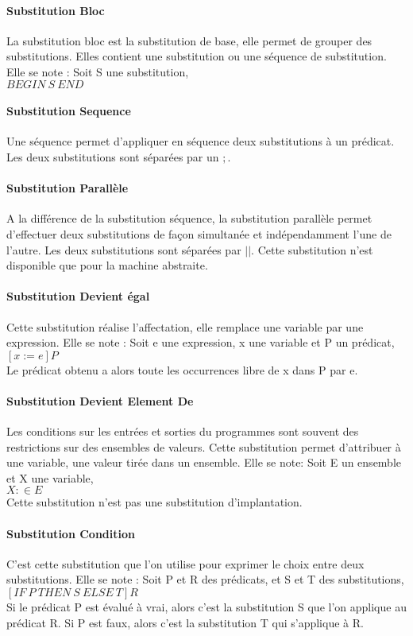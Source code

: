 \paragraph{Substitution Bloc}
La substitution bloc est la substitution de base, elle permet de grouper des
substitutions. Elles contient une substitution ou une séquence de substitution.
Elle se note : Soit S une substitution, \\
$BEGIN~ S~ END$ 

\paragraph{Substitution Sequence}
Une séquence permet d'appliquer en séquence deux substitutions à un
prédicat. Les deux substitutions sont séparées par un $;$.

\paragraph{Substitution Parallèle}
A la différence de la substitution séquence, la substitution parallèle permet
d'effectuer deux substitutions de façon simultanée et indépendamment l'une de
l'autre. Les deux substitutions sont séparées par $||$. Cette substitution n'est
disponible que pour la machine abstraite.

\paragraph{Substitution Devient égal}
Cette substitution réalise l'affectation, elle remplace une variable
par une expression. Elle se note : Soit e une expression, x une
variable et P un prédicat, \\ 
$[x:=e]P$  \\
Le prédicat obtenu a alors toute les occurrences libre de x dans P par e.

\paragraph{Substitution Devient Element De}
Les conditions sur les entrées et sorties du programmes sont souvent
des restrictions sur des ensembles de valeurs. Cette substitution permet
d'attribuer à une variable, une valeur tirée dans un ensemble. Elle se note:
Soit E un ensemble et X une variable, \\
$X:\in E$\\
Cette substitution n'est pas une substitution d'implantation.

\paragraph{Substitution Condition}
C'est cette substitution que l'on utilise pour exprimer le choix entre deux
substitutions. Elle se note : Soit P et R des prédicats, et S et T des substitutions,\\
$[IF~ P~ THEN~ S~ ELSE~ T]R$ \\
Si le prédicat P est évalué à vrai, alors c'est la substitution S que l'on
applique au prédicat R. Si P est faux, alors c'est la substitution T qui
s'applique à R.

